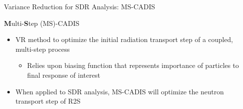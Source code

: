 \documentclass{beamer}
\begin{document}
\begin{frame}{Variance Reduction for SDR Analysis: MS-CADIS}
	\begin{block}{\textbf{M}ulti-\textbf{S}tep (MS)-CADIS \cite{mscadis}}
  \begin{itemize}
  \item {VR method to optimize the initial radiation transport step of a
	  coupled, multi-step process}
		  \begin{itemize}
			  \item{Relies upon biasing function that represents importance
				  of particles to final response of
				  interest}
		  \end{itemize}
	  
	  \item{When applied to SDR analysis, MS-CADIS will optimize the
		  neutron transport step of R2S}
\end{itemize}
\end{block}
%
\end{frame}
\end{document}
